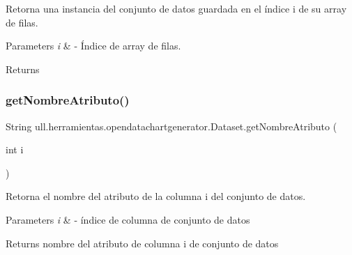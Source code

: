 Retorna una instancia del conjunto de datos guardada en el índice i de su array de filas. 


\begin{DoxyParams}{Parameters}
{\em i} & -\/ Índice de array de filas. \\
\hline
\end{DoxyParams}
\begin{DoxyReturn}{Returns}

\end{DoxyReturn}
\mbox{\label{classull_1_1herramientas_1_1opendatachartgenerator_1_1_dataset_a2992d2c0880bea4d777dc4c09f1e288c}} 
\subsubsection{\texorpdfstring{get\+Nombre\+Atributo()}{getNombreAtributo()}}
{\footnotesize\ttfamily String ull.\+herramientas.\+opendatachartgenerator.\+Dataset.\+get\+Nombre\+Atributo (\begin{DoxyParamCaption}\item[{int}]{i }\end{DoxyParamCaption})}



Retorna el nombre del atributo de la columna i del conjunto de datos. 


\begin{DoxyParams}{Parameters}
{\em i} & -\/ índice de columna de conjunto de datos \\
\hline
\end{DoxyParams}
\begin{DoxyReturn}{Returns}
nombre del atributo de columna i de conjunto de datos 
\end{DoxyReturn}
\mbox{\label{classull_1_1herramientas_1_1opendatachartgenerator_1_1_dataset_a108bc150d3c0505b91022cccd04238e1}} 
